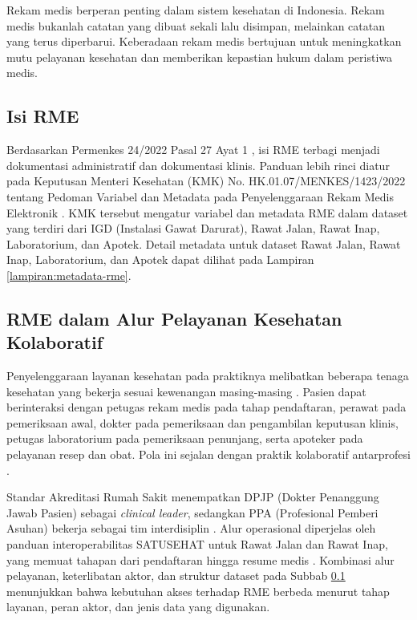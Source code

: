 \documentclass[bahasa, 12pt, a4paper, onecolumn, oneside, final]{report}
\begin{document}
Rekam medis berperan penting dalam sistem kesehatan di Indonesia. Rekam medis bukanlah catatan yang dibuat sekali lalu disimpan, melainkan catatan yang terus diperbarui. Keberadaan rekam medis bertujuan untuk meningkatkan mutu pelayanan kesehatan dan memberikan kepastian hukum dalam peristiwa medis.

\subsection{Isi RME}
\label{subsec:isi-rme}

Berdasarkan Permenkes 24/2022 Pasal 27 Ayat 1 \autocite{permenkes24_2022}, isi RME terbagi menjadi dokumentasi administratif dan dokumentasi klinis. Panduan lebih rinci diatur pada Keputusan Menteri Kesehatan (KMK) No. HK.01.07/MENKES/1423/2022 tentang Pedoman Variabel dan Metadata pada Penyelenggaraan Rekam Medis Elektronik \autocite{kemenkes1423-2022}. KMK tersebut mengatur variabel dan metadata RME dalam dataset yang terdiri dari IGD (Instalasi Gawat Darurat), Rawat Jalan, Rawat Inap, Laboratorium, dan Apotek. Detail metadata untuk dataset Rawat Jalan, Rawat Inap, Laboratorium, dan Apotek dapat dilihat pada Lampiran \ref{lampiran:metadata-rme}.

\subsection{RME dalam Alur Pelayanan Kesehatan Kolaboratif}
\label{subsec:rme-layanan-kolaboratif}

Penyelenggaraan layanan kesehatan pada praktiknya melibatkan beberapa tenaga kesehatan yang bekerja sesuai kewenangan masing-masing \autocite{who2010_interprofessional_collaborative_practice}. Pasien dapat berinteraksi dengan petugas rekam medis pada tahap pendaftaran, perawat pada pemeriksaan awal, dokter pada pemeriksaan dan pengambilan keputusan klinis, petugas laboratorium pada pemeriksaan penunjang, serta apoteker pada pelayanan resep dan obat. Pola ini sejalan dengan praktik kolaboratif antarprofesi \autocite{srinivas2023synergistic}.

Standar Akreditasi Rumah Sakit menempatkan DPJP (Dokter Penanggung Jawab Pasien) sebagai \textit{clinical leader}, sedangkan PPA (Profesional Pemberi Asuhan) bekerja sebagai tim interdisiplin \autocite{kmk1128_2022}. Alur operasional diperjelas oleh panduan interoperabilitas SATUSEHAT untuk Rawat Jalan dan Rawat Inap, yang memuat tahapan dari pendaftaran hingga resume medis \autocite{satusehat_rme_rawat_jalan,satusehat_rawat_inap_new}. Kombinasi alur pelayanan, keterlibatan aktor, dan struktur dataset pada Subbab \ref{subsec:isi-rme} menunjukkan bahwa kebutuhan akses terhadap RME berbeda menurut tahap layanan, peran aktor, dan jenis data yang digunakan.
\end{document}
